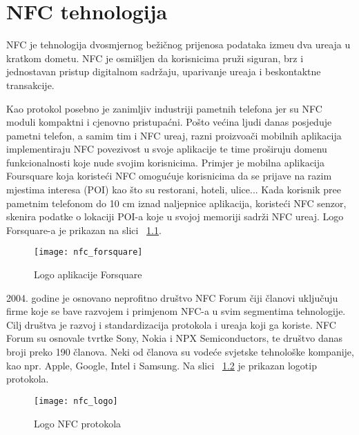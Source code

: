 \chapter{NFC tehnologija}
NFC je tehnologija dvosmjernog be\v{z}i\v{c}nog prijenosa podataka izme\dj u dva ure\dj aja u kratkom dometu. NFC je osmi\v{s}ljen da korisnicima pru\v{z}i siguran, brz i jednostavan pristup digitalnom sadr\v{z}aju, uparivanje ure\dj aja i beskontaktne transakcije.

Kao protokol posebno je zanimljiv industriji pametnih telefona jer su NFC moduli kompaktni i cjenovno pristupa\'{c}ni. Po\v{s}to ve\'{c}ina ljudi danas posjeduje pametni telefon, a samim tim i NFC ure\dj aj, razni proizvo\dj a\v{c}i mobilnih aplikacija implementiraju NFC povezivost u svoje aplikacije te time pro\v{s}iruju domenu funkcionalnosti koje nude svojim korisnicima. Primjer je mobilna aplikacija Foursquare \cite{foursquare} koja koriste\'{c}i NFC omogu\'{c}uje korisnicima da se prijave na razim mjestima interesa (POI) kao \v{s}to su restorani, hoteli, ulice... Kada korisnik pre\dj e pametnim telefonom do 10 cm iznad naljepnice aplikacija, koriste\'{c}i NFC senzor, skenira podatke o lokaciji POI-a koje u svojoj memoriji sadr\v{z}i NFC ure\dj aj. Logo Forsquare-a je prikazan na slici  ~\ref{fig:forsquare}.

\begin{figure}[!htbp]
	\begin{center}
 \texttt{[image: nfc\_forsquare]}
 \caption{Logo aplikacije Forsquare}
 \label{fig:forsquare}
	\end{center}
\end{figure}

2004. godine je osnovano neprofitno dru\v{s}tvo NFC Forum \cite{nfc_forum} \v{c}iji \v{c}lanovi uklju\v{c}uju firme koje se bave razvojem i primjenom NFC-a u svim segmentima tehnologije. Cilj dru\v{s}tva je razvoj i standardizacija protokola i ure\dj aja koji ga koriste. NFC Forum su osnovale tvrtke Sony, Nokia i NPX Semiconductors, te dru\v{s}tvo danas broji preko 190 \v{c}lanova. Neki od \v{c}lanova su vode\'{c}e svjetske tehnolo\v{s}ke kompanije, kao npr. Apple, Google, Intel i Samsung. Na slici  ~\ref{fig:nfc} je prikazan logotip protokola.

\begin{figure}[!htbp]
	\begin{center}
 \texttt{[image: nfc\_logo]}
 \caption{Logo NFC protokola}
 \label{fig:nfc}
	\end{center}
\end{figure}


